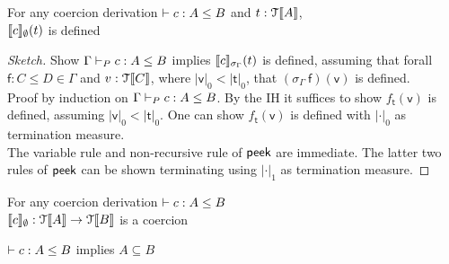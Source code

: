 \documentclass[a4paper,UKenglish,cleveref, autoref, thm-restate]{lipics-v2021}
\begin{document}
\begin{lemma}[Termination]
For any coercion derivation $\contains{}{c}{A}{B}$ and $\mathsf{t} : \type{A}$,\\ 
$\interp{c}_\emptyset(\mathsf{t})$ is defined  %
\end{lemma}
\begin{proof}[Sketch]
Show $\containsG{c}{A}{B}$ implies $\interp{c}_{\sigma_{\Gamma}}(\mathsf{t})$ is defined, assuming that forall $\mathsf{f} : C \leq D \in \Gamma$ and $\mathsf{v} : \type{C}$, where $|\mathsf{v}|_0 < |\mathsf{t}|_0$, that $(\sigma_{\Gamma}~\mathsf{f})(\mathsf{v})$ is defined.\\
Proof by induction on $\containsG{c}{A}{B}$. By the IH it suffices to show $f_{\mathsf{t}}(\mathsf{v})$ is defined, assuming $|\mathsf{v}|_0 < |\mathsf{t}|_0$. One can show $f_{\mathsf{t}}(\mathsf{v})$ is defined with $|\cdot|_0$ as termination measure.\\
The variable rule and non-recursive rule of $\textsf{peek}$ are immediate. The latter two rules of $\textsf{peek}$ can be shown terminating using $|\cdot|_1$ as termination measure.
\end{proof}
\begin{lemma}
 For any coercion derivation $\contains{}{c}{A}{B}$\\ 
$\llbracket c \rrbracket_\emptyset :\mathcal{T}\llbracket A \rrbracket \rightarrow \mathcal{T}\llbracket B \rrbracket$ is a coercion
\end{lemma}
\begin{corollary}[Soundness]
$\contains{}{c}{A}{B}$ implies $A \subseteq B$
\end{corollary}
\end{document}
